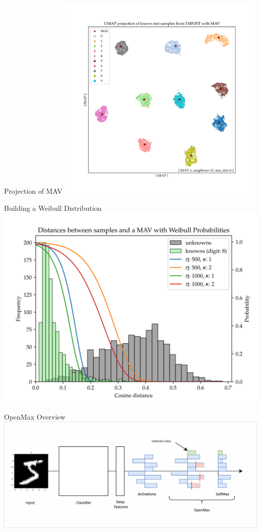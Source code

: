 \begin{frame}{Projection of MAV}
	\centering
	\includegraphics[width=0.75\textwidth]{figures/umap_projection_emnist.png}
\end{frame}

\begin{frame}{Building a Weibull Distribution}
	\centering
	\includegraphics[width=\textwidth]{figures/distances-to-mav.png}
\end{frame}

\begin{frame}{OpenMax Overview}
	\centering
	\includegraphics[width=\textwidth]{figures/openmax.drawio.png}
\end{frame}


